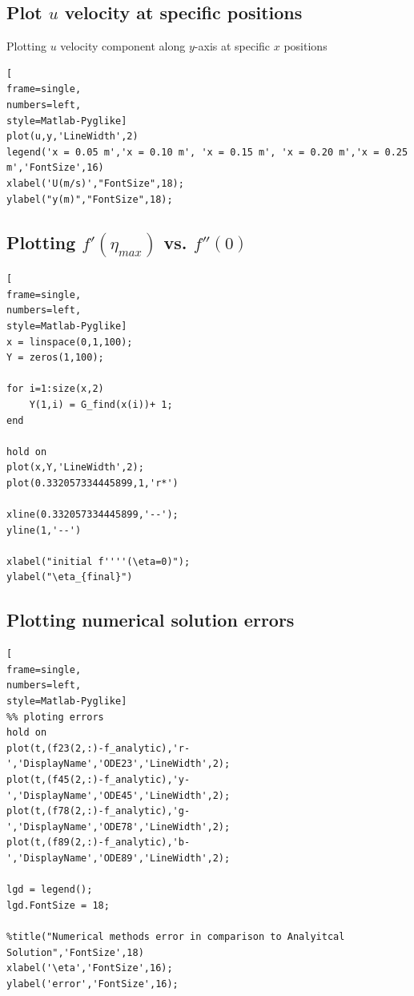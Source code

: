 \documentclass[]{report}
\begin{document}
\subsection{Plot $u$ velocity at specific positions}
\label{func:xspec}
Plotting $u$ velocity component along $y$-axis at specific $x$ positions
\begin{lstlisting}[
frame=single,
numbers=left,
style=Matlab-Pyglike]
plot(u,y,'LineWidth',2)
legend('x = 0.05 m','x = 0.10 m', 'x = 0.15 m', 'x = 0.20 m','x = 0.25 m','FontSize',16)
xlabel('U(m/s)',"FontSize",18);
ylabel("y(m)","FontSize",18);
\end{lstlisting}

\subsection{Plotting $f'(\eta_{max})$ vs. $f''(0)$}
\label{func:G_find}
\begin{lstlisting}[
frame=single,
numbers=left,
style=Matlab-Pyglike]
x = linspace(0,1,100);
Y = zeros(1,100);

for i=1:size(x,2)
    Y(1,i) = G_find(x(i))+ 1;
end

hold on
plot(x,Y,'LineWidth',2);
plot(0.332057334445899,1,'r*')

xline(0.332057334445899,'--');
yline(1,'--')

xlabel("initial f''''(\eta=0)");
ylabel("\eta_{final}")
\end{lstlisting}

\subsection{Plotting numerical solution errors}
\label{func:errors}
\begin{lstlisting}[
frame=single,
numbers=left,
style=Matlab-Pyglike]
%% ploting errors
hold on
plot(t,(f23(2,:)-f_analytic),'r-','DisplayName','ODE23','LineWidth',2);
plot(t,(f45(2,:)-f_analytic),'y-','DisplayName','ODE45','LineWidth',2);
plot(t,(f78(2,:)-f_analytic),'g-','DisplayName','ODE78','LineWidth',2);
plot(t,(f89(2,:)-f_analytic),'b-','DisplayName','ODE89','LineWidth',2);

lgd = legend();
lgd.FontSize = 18;

%title("Numerical methods error in comparison to Analyitcal Solution",'FontSize',18)
xlabel('\eta','FontSize',16);
ylabel('error','FontSize',16);
\end{lstlisting}
\end{document}
